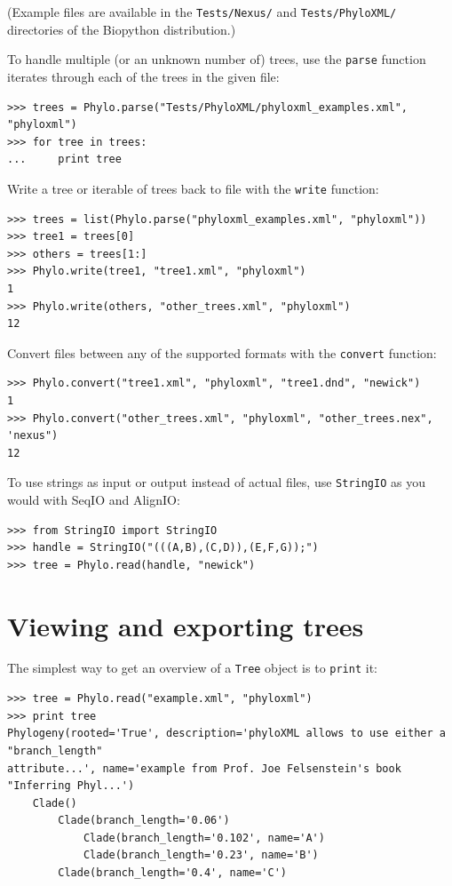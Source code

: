 \documentclass{report}
\begin{document}
(Example files are available in the \texttt{Tests/Nexus/} and \texttt{Tests/PhyloXML/}
directories of the Biopython distribution.)

To handle multiple (or an unknown number of) trees, use the \verb|parse| function iterates
through each of the trees in the given file: 

\begin{verbatim}
>>> trees = Phylo.parse("Tests/PhyloXML/phyloxml_examples.xml", "phyloxml")
>>> for tree in trees:
...     print tree
\end{verbatim}

Write a tree or iterable of trees back to file with the \verb|write| function:

\begin{verbatim}
>>> trees = list(Phylo.parse("phyloxml_examples.xml", "phyloxml"))
>>> tree1 = trees[0]
>>> others = trees[1:]
>>> Phylo.write(tree1, "tree1.xml", "phyloxml")
1
>>> Phylo.write(others, "other_trees.xml", "phyloxml")
12
\end{verbatim}

Convert files between any of the supported formats with the \verb|convert| function:

\begin{verbatim}
>>> Phylo.convert("tree1.xml", "phyloxml", "tree1.dnd", "newick")
1
>>> Phylo.convert("other_trees.xml", "phyloxml", "other_trees.nex", 'nexus")
12
\end{verbatim}

To use strings as input or output instead of actual files, use \verb|StringIO| as you would
with SeqIO and AlignIO:

\begin{verbatim}
>>> from StringIO import StringIO
>>> handle = StringIO("(((A,B),(C,D)),(E,F,G));")
>>> tree = Phylo.read(handle, "newick")
\end{verbatim}


\section{Viewing and exporting trees}

The simplest way to get an overview of a \verb|Tree| object is to \verb|print| it:

\begin{verbatim}
>>> tree = Phylo.read("example.xml", "phyloxml")
>>> print tree
Phylogeny(rooted='True', description='phyloXML allows to use either a "branch_length"
attribute...', name='example from Prof. Joe Felsenstein's book "Inferring Phyl...')
    Clade()
        Clade(branch_length='0.06')
            Clade(branch_length='0.102', name='A')
            Clade(branch_length='0.23', name='B')
        Clade(branch_length='0.4', name='C')
\end{verbatim}
\end{document}
